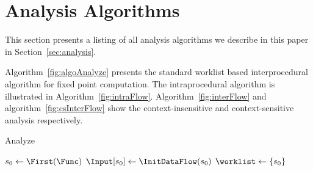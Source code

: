 \section{Analysis Algorithms}\label{app:algo}

This section presents a listing of all analysis algorithms
we describe in this paper in Section~\ref{sec:analysis}.

Algorithm~\ref{fig:algoAnalyze} presents the standard worklist
based interprocedural algorithm for fixed point computation.
The intraprocedural algorithm is illustrated in
Algorithm~\ref{fig:intraFlow}. Algorithm~\ref{fig:interFlow}
and algorithm~\ref{fig:csInterFlow} show the context-insensitive
and context-sensitive analysis respectively.

\IncMargin{1em}
\begin{algorithm}[!h]
\caption{Analyze}\label{fig:algoAnalyze}
\SetAlgoLined
\LinesNumbered
\DontPrintSemicolon
{}


\OutData{}
$ s_0 \leftarrow \First(\Func)$\;
$\Input[s_0] \leftarrow \InitDataFlow(s_0)$\;
$\worklist \leftarrow \set{s_0}$\;
\While{ $\worklist\ \neq\ \emptyset$ }{
	$\varI \leftarrow \Next(\worklist)$\;
	$\Output[i] \leftarrow \InterFlow(\AnalyzeAlgo, \varI)$\;
	\ForEach{ $\varJ \in \Succs(\varI)$ }{
		\If{ $\Output[\varI] \not\sqsubseteq \Input[\varJ]$}{
			$\Input[\varJ] \leftarrow \Input[\varJ] \sqcup \Output[\varI]$\;
			$\worklist \leftarrow \worklist \cup\ \set{\varJ}$\;
		}	
	}
}
\end{algorithm}
\DecMargin{1em}

\newpage

